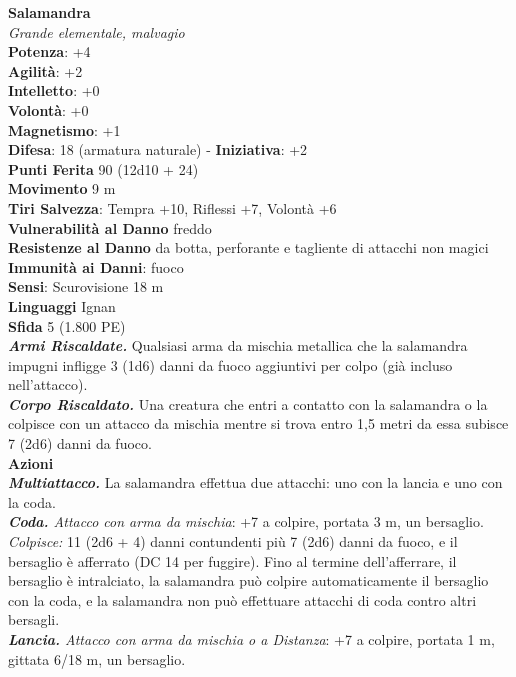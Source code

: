\begin{multicols}{2}
\medskip\textbf{Salamandra}\\
\emph{Grande elementale, malvagio}\\
\textbf{Potenza}: +4\\
\textbf{Agilità}: +2\\
\textbf{Intelletto}: +0\\
\textbf{Volontà}: +0\\
\textbf{Magnetismo}: +1\\
\textbf{Difesa}: 18 (armatura naturale) - \textbf{Iniziativa}: +2\\
\textbf{Punti Ferita} 90 (12d10 + 24)\\
\textbf{Movimento} 9 m\\
\textbf{Tiri Salvezza}: Tempra +10, Riflessi +7, Volontà +6\\
\textbf{Vulnerabilità al Danno} freddo\\
\textbf{Resistenze al Danno} da botta, perforante e tagliente di attacchi non magici\\
\textbf{Immunità ai Danni}: fuoco\\
\textbf{Sensi}: Scurovisione 18 m\\
\textbf{Linguaggi} Ignan\\
\textbf{Sfida} 5 (1.800 PE)\smallskip\\
\emph{\textbf{Armi Riscaldate.}} Qualsiasi arma da mischia metallica che la salamandra impugni infligge 3 (1d6) danni da fuoco aggiuntivi per colpo (già incluso nell'attacco).\\
\emph{\textbf{Corpo Riscaldato.}} Una creatura che entri a contatto con la salamandra o la colpisce con un attacco da mischia mentre si trova entro 1,5 metri da essa subisce 7 (2d6) danni da fuoco.\\
\smallskip\textbf{Azioni}\\
\emph{\textbf{Multiattacco.}} La salamandra effettua due attacchi: uno con la lancia e uno con la coda.\\
\emph{\textbf{Coda.} Attacco con arma da mischia}: +7 a colpire, portata 3 m, un bersaglio.\\
\emph{Colpisce:} 11 (2d6 + 4) danni contundenti più 7 (2d6) danni da fuoco, e il bersaglio è afferrato (DC 14 per fuggire). Fino al termine dell'afferrare, il bersaglio è intralciato, la salamandra può colpire automaticamente il bersaglio con la coda, e la salamandra non può effettuare attacchi di coda contro altri bersagli.\\
\emph{\textbf{Lancia.} Attacco con arma da mischia o a Distanza}: +7 a colpire, portata 1 m, gittata 6/18 m, un bersaglio.\\

\end{multicols}
